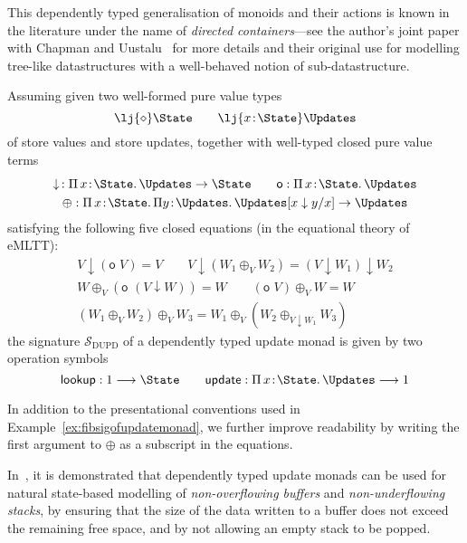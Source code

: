 This dependently typed generalisation of monoids and their actions is known in the literature under the name of \emph{directed containers}---see the author's joint paper with Chapman and Uustalu~\cite{Ahman:Dcontainers} for more details and their original use for modelling tree-like datastructures with a well-behaved notion of sub-datastructure.


\begin{example}
\label{ex:fibsigofdeptypedupdatemonad}
Assuming given two well-formed pure value types
\[
\lj {\diamond} \State
\qquad
\lj {x \!:\! \State} \Updates
\]
of store values and store updates, together with well-typed closed pure value terms
\[
\begin{array}{c}
\downarrow\, : \Pi\, x \!:\! \State .\, \Updates \to \State
\qquad
\mathsf{o} : \Pi\, x \!:\! \State .\, \Updates
\\[1mm]
\oplus : \Pi\,x \!:\! \State .\, \Pi y \!:\! \Updates .\, \Updates[x \downarrow y/x] \to \Updates
\end{array}
\]
satisfying the following five closed equations (in the equational theory of eMLTT):
\[
\begin{array}{c}
V \downarrow (\mathsf{o}\,\, V) = V 
\qquad
V \downarrow (W_1 \oplus_{V} W_2) = (V \downarrow W_1) \downarrow W_2
\\[2mm]
W \oplus_{V} (\mathsf{o}\,\, (V \downarrow W)) = W
\qquad
(\mathsf{o}\,\, V) \oplus_V W = W
\\[2mm]
(W_1 \oplus_V W_2) \oplus_V W_3 = W_1 \oplus_V (W_2 \oplus_{V \downarrow W_1} W_3)
\end{array}
\]
the signature $\mathcal{S}_{\text{DUPD}}$ of a dependently typed update monad is given by two operation symbols
\[
\mathsf{lookup} : 1 \longrightarrow \State
\qquad
\mathsf{update} : \Pi\, x \!:\! \State .\, \Updates \longrightarrow 1
\]

In addition to the presentational conventions used in Example~\ref{ex:fibsigofupdatemonad}, we further improve readability by writing the first argument to $\oplus$ as a subscript in the equations.
%
\end{example}

In~\cite[Examples~10 and~11]{Ahman:UpdateMonads}, it is demonstrated that dependently typed update monads can be used for natural state-based modelling of \emph{non-overflowing  buffers} and \emph{non-under\-flowing stacks}, by ensuring that the size of the data written to a buffer does not exceed the remaining free space, and by not allowing an empty stack to be popped.

